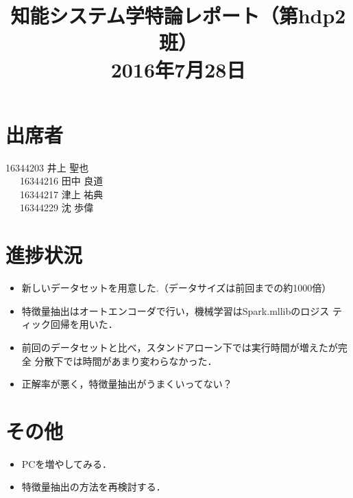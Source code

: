 \documentclass[a4paper,12pt]{jarticle}
\begin{document}
%
\title{\vspace{-30mm}知能システム学特論レポート（第hdp2班）\\ 2016年7月28日}
\date{}
%
%
\maketitle
%
\vspace{-30mm}
%
\section{出席者}
16344203 井上 聖也\\
~~~16344216 田中 良道\\
~~~16344217 津上 祐典\\
~~~16344229 沈 歩偉
\section{進捗状況}
 \begin{itemize}
 \item 新しいデータセットを用意した.（データサイズは前回までの約1000倍） 
 \item 特徴量抽出はオートエンコーダで行い，機械学習はSpark.mllibのロジス
	   ティック回帰を用いた．
 \item 前回のデータセットと比べ，スタンドアローン下では実行時間が増えたが完全
	   分散下では時間があまり変わらなかった．
 \item 正解率が悪く，特徴量抽出がうまくいってない？
 \end{itemize}

\section{その他}
\begin{itemize}
 \item PCを増やしてみる．
 \item 特徴量抽出の方法を再検討する．
\end{itemize}
\end{document}
